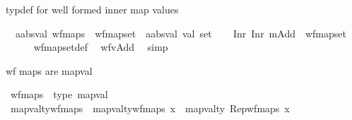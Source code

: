 \begin{isabellebody}
\endisatagproof
{\isafoldproof}%
%
\isadelimproof
%
\endisadelimproof
%
\begin{isamarkuptext}%
typdef for well formed inner map values%
\end{isamarkuptext}\isamarkuptrue%
\isamarkupfalse%
\ {\isacharparenleft}{\kern0pt}\ {\isacharprime}{\kern0pt}a{\isacharcolon}{\kern0pt}{\isacharcolon}{\kern0pt}absval\ wf{\isacharunderscore}{\kern0pt}maps\ {\isacharequal}{\kern0pt}\ {\isachardoublequoteopen}wf{\isacharunderscore}{\kern0pt}map{\isacharunderscore}{\kern0pt}set\ {\isacharcolon}{\kern0pt}{\isacharcolon}{\kern0pt}\ {\isacharprime}{\kern0pt}a{\isacharcolon}{\kern0pt}{\isacharcolon}{\kern0pt}absval\ val{}{}{}\ set{\isachardoublequoteclose}\isanewline
%
\isadelimproof
%
\endisadelimproof
%
\isatagproof
{}\isamarkupfalse%
\isanewline
\ \ \isamarkupfalse%
\ {\isachardoublequoteopen}{\isacharparenleft}{\kern0pt}Inr\ {\isacharparenleft}{\kern0pt}Inr\ mAdd{}{\isacharparenright}{\kern0pt}{\isacharparenright}{\kern0pt}\ {\isasymin}\ wf{\isacharunderscore}{\kern0pt}map{\isacharunderscore}{\kern0pt}set{\isachardoublequoteclose}\ \ \isanewline
\ \ \ \ \isamarkupfalse%
\ wf{\isacharunderscore}{\kern0pt}map{\isacharunderscore}{\kern0pt}set{\isacharunderscore}{\kern0pt}def\ \isamarkupfalse%
\ wf{\isacharunderscore}{\kern0pt}vAdd{}\ \isamarkupfalse%
\ simp\isanewline
{}\isamarkupfalse%
%
\endisatagproof
{\isafoldproof}%
%
\isadelimproof
%
\endisadelimproof
%
\begin{isamarkuptext}%
wf maps are mapval%
\end{isamarkuptext}\isamarkuptrue%
\isamarkupfalse%
\ wf{\isacharunderscore}{\kern0pt}maps\ {\isacharcolon}{\kern0pt}{\isacharcolon}{\kern0pt}\ {\isacharparenleft}{\kern0pt}type{\isacharparenright}{\kern0pt}\ mapval\ \isanewline
\ \ \isamarkupfalse%
\ mapval{\isacharunderscore}{\kern0pt}ty{\isacharunderscore}{\kern0pt}wf{\isacharunderscore}{\kern0pt}maps\ \ {\isachardoublequoteopen}mapval{\isacharunderscore}{\kern0pt}ty{\isacharunderscore}{\kern0pt}wf{\isacharunderscore}{\kern0pt}maps\ x\ {\isacharequal}{\kern0pt}\ mapval{\isacharunderscore}{\kern0pt}ty\ {\isacharparenleft}{\kern0pt}Rep{\isacharunderscore}{\kern0pt}wf{\isacharunderscore}{\kern0pt}maps\ x{\isacharparenright}{\kern0pt}{\isachardoublequoteclose}\isanewline

\end{isabellebody}
